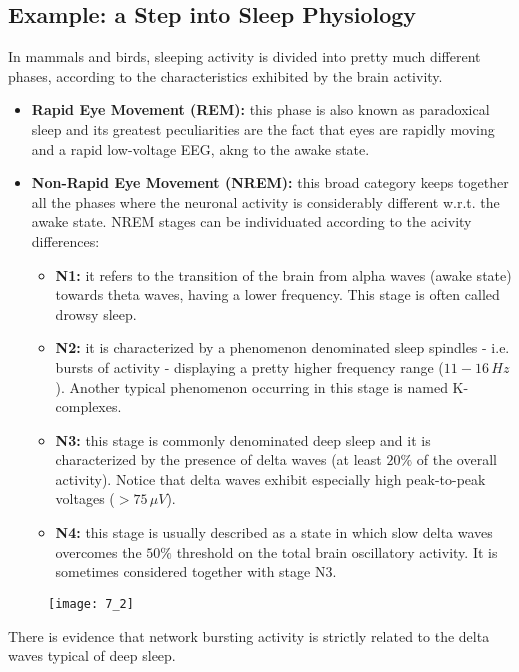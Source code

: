 \subsection{Example: a Step into Sleep Physiology}
In mammals and birds, sleeping activity is divided into pretty much different
phases, according to the characteristics exhibited by the brain activity.
\begin{itemize}
    \item \textbf{Rapid Eye Movement (REM):} this phase is also known as paradoxical
          sleep and its greatest peculiarities are the fact that eyes are rapidly moving
          and a rapid low-voltage EEG, akng to the awake state.
    \item \textbf{Non-Rapid Eye Movement (NREM):} this broad category keeps together
          all the phases where the neuronal activity is considerably different w.r.t. the
          awake state. NREM stages can be individuated according to the acivity differences:
          \begin{itemize}
              \item \textbf{N1:} it refers to the transition of the brain from alpha waves
                    (awake state) towards theta waves, having a lower frequency. This stage is
                    often called drowsy sleep.
              \item \textbf{N2:} it is characterized by a phenomenon denominated sleep
                    spindles - i.e. bursts of activity - displaying a pretty higher frequency range
                    (\(11-16\,Hz\)). Another typical phenomenon occurring in this stage is named
                    K-complexes.
              \item \textbf{N3:} this stage is commonly denominated deep sleep and it is
                    characterized by the presence of delta waves (at least \(20\%\) of the
                    overall activity). Notice that delta waves exhibit especially high
                    peak-to-peak voltages (\(>75\,\mu{V}\)).
              \item \textbf{N4:} this stage is usually described as a state in which slow
                    delta waves overcomes the \(50\%\) threshold on the total brain oscillatory
                    activity. It is sometimes considered together with stage N3.
          \end{itemize}
\end{itemize}
\begin{figure}[H]
    \texttt{[image: 7\_2]}
    \centering
\end{figure}
There is evidence that network bursting activity is strictly related to the delta
waves typical of deep sleep.

